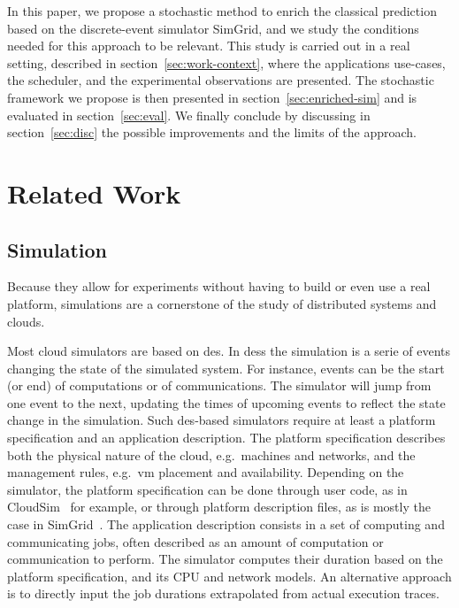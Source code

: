 \documentclass[10pt,conference,compsocconf]{IEEEtran}
\begin{document}
In this paper, we propose a stochastic method to enrich the classical prediction
based  on the  discrete-event simulator  SimGrid,  and we  study the  conditions
needed for  this approach to be  relevant. This study  is carried out in  a real
setting,  described in  section~\ref{sec:work-context},  where the  applications
use-cases, the scheduler, and the  experimental observations are presented.  The
stochastic     framework     we     propose     is     then     presented     in
section~\ref{sec:enriched-sim}  and is  evaluated in  section~\ref{sec:eval}. We
finally conclude by  discussing in section~\ref{sec:disc} the possible
improvements and the  limits of the approach.


\section{Related Work}

\subsection{Simulation}

Because they allow for experiments without having to build or even use a real 
platform, simulations are a cornerstone of the study of distributed
systems and clouds.  

Most cloud simulators  are based on \ac{des}. In \aclp{des}  the simulation is a
serie  of events  changing the  state of  the simulated  system.  For  instance,
events can  be the  start (or  end) of computations  or of  communications.  The
simulator will jump from  one event to the next, updating  the times of upcoming
events  to reflect  the state  change  in the  simulation.  Such  \ac{des}-based
simulators  require  at  least  a  platform  specification  and  an  application
description.  The platform  specification describes both the  physical nature of
the cloud,  e.g.~machines and networks,  and the management  rules, e.g.~\ac{vm}
placement  and   availability.   Depending   on  the  simulator,   the  platform
specification can be done through  user code, as in CloudSim~\cite{cloudsim} for
example,  or through  platform  description  files, as  is  mostly  the case  in
SimGrid~\cite{simgrid}.   The  application  description  consists in  a  set  of
computing and communicating  jobs, often described as an  amount of computation
or communication to perform. The simulator  computes their duration based on the
platform specification, and its CPU and network models.  An alternative approach
is  to directly  input the  job  durations extrapolated  from actual  execution
traces.
\end{document}
